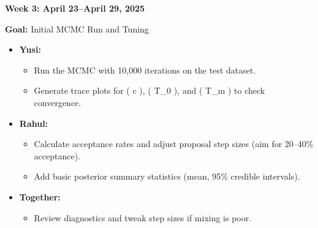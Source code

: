 \documentclass[
  letterpaper,
  DIV=11,
  numbers=noendperiod]{scrreprt}
\providecommand{\tightlist}{%
  \setlength{\itemsep}{0pt}\setlength{\parskip}{0pt}}
\begin{document}
\textbf{Week 3: April 23--April 29, 2025}

\textbf{Goal:} Initial MCMC Run and Tuning

\begin{itemize}
\tightlist
\item
  \textbf{Yusi:}

  \begin{itemize}
  \tightlist
  \item
    Run the MCMC with 10,000 iterations on the test dataset.
  \item
    Generate trace plots for ( c ), ( T\_0 ), and ( T\_m ) to check
    convergence.
  \end{itemize}
\item
  \textbf{Rahul:}

  \begin{itemize}
  \tightlist
  \item
    Calculate acceptance rates and adjust proposal step sizes (aim for
    20--40\% acceptance).
  \item
    Add basic posterior summary statistics (mean, 95\% credible
    intervals).
  \end{itemize}
\item
  \textbf{Together:}

  \begin{itemize}
  \tightlist
  \item
    Review diagnostics and tweak step sizes if mixing is poor.
  \end{itemize}
\end{itemize}
\end{document}
